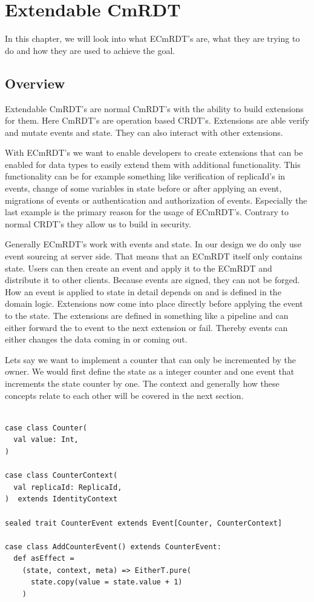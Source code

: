 \documentclass[
	ngerman,
	ruledheaders=section,   %
	class=report,		    %
	thesis={type=bachelor}, %
	accentcolor=9c,			%
	custommargins=true,    %
	marginpar=false,        %
	parskip=half-,          %
	fontsize=11pt,          %
]{tudapub}
\begin{document}
\chapter{Extendable CmRDT}
In this chapter, we will look into what ECmRDT's are, what they are trying to do and how they are used to achieve the goal.

\section{Overview}
Extendable CmRDT's are normal CmRDT's with the ability to build extensions for them. Here CmRDT's are operation based CRDT's. Extensions are able verify and mutate events and state. They can also interact with other extensions. 

With ECmRDT's we want to enable developers to create extensions that can be enabled for data types to easily extend them with additional functionality. This functionality can be for example something like verification of replicaId's in events, change of some variables in state before or after applying an event, migrations of events or authentication and authorization of events. Especially the last example is the primary reason for the usage of ECmRDT's. Contrary to normal CRDT's they allow us to build in security.

Generally ECmRDT's work with events and state. In our design we do only use event sourcing at server side. That means that an ECmRDT itself only contains state. Users can then create an event and apply it to the ECmRDT and distribute it to other clients. Because events are signed, they can not be forged. How an event is applied to state in detail depends on and is defined in the domain logic. Extensions now come into place directly before applying the event to the state. The extensions are defined in something like a pipeline and can either forward the to event to the next extension or fail. Thereby events can either changes the data coming in or coming out.

Lets say we want to implement a counter that can only be incremented by the owner. We would first define the state as a integer counter and one event that increments the state counter by one. The context and generally how these concepts relate to each other will be covered in the next section.

\begin{lstlisting}
    
case class Counter(
  val value: Int,
) 

case class CounterContext(
  val replicaId: ReplicaId,
)  extends IdentityContext

sealed trait CounterEvent extends Event[Counter, CounterContext]

case class AddCounterEvent() extends CounterEvent:
  def asEffect =
    (state, context, meta) => EitherT.pure(
      state.copy(value = state.value + 1)
    )

\end{lstlisting}
\end{document}
